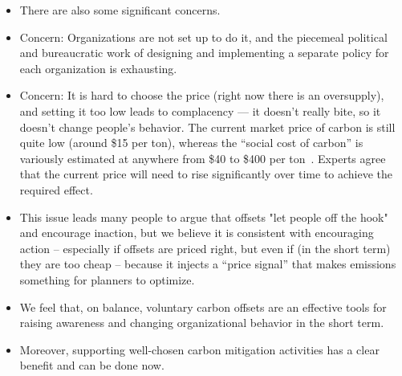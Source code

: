 \documentclass[12pt]{article}
\newcommand{\bcp}[1]{\ifdraft{\bf [bcp: #1]}\fi}
\begin{document}
\begin{itemize}
\item There are also some significant
concerns.
\item Concern: Organizations are not set up to do it, and the piecemeal
political and bureaucratic work of designing and implementing a separate
policy for each organization is exhausting.
\item Concern: It is hard to choose the price (right now there is an
oversupply), and setting it too low leads to complacency --- it doesn't
really bite, so it doesn't change people's behavior.  The current market
price of carbon is still quite low (around \$15 per ton), whereas the
``social cost of carbon'' is variously estimated at anywhere from \$40 to
\$400 per ton~\bcp{citation}.
Experts agree that the current price will need to rise significantly
over time to achieve the required effect.
\item This issue leads many people to argue that offsets "let people off the
hook" and encourage inaction, but we believe it is consistent with
encouraging action -- especially if offsets are priced right, but even if
(in the short term) they are too cheap -- because it injects a ``price
signal'' that makes emissions something for planners to optimize.
\item We feel that, on balance, voluntary carbon offsets are an effective
tools for raising awareness and changing organizational behavior in the
short term.
\item Moreover, supporting well-chosen carbon mitigation activities has a
clear benefit and can be done now.
\end{itemize}
\end{document}

